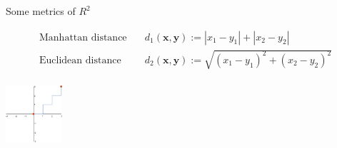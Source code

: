 \documentclass{beamer}
\begin{document}
\begin{frame}{Some metrics of $R^2$}
    \begin{block}{}
        \begin{align*}
            \text{Manhattan distance} \quad & d_1(\textbf{x},\textbf{y}) :=
            |x_1 - y_1| + |x_2 - y_2| \\
            \text{Euclidean distance} \quad & d_2(\textbf{x},\textbf{y}) :=
            \sqrt{(x_1 - y_1)^2 + (x_2 - y_2)^2} \\
        \end{align*}
        \end{block}
        \includegraphics[height=80]{graph2.pdf} \quad

\end{frame}
\end{document}
